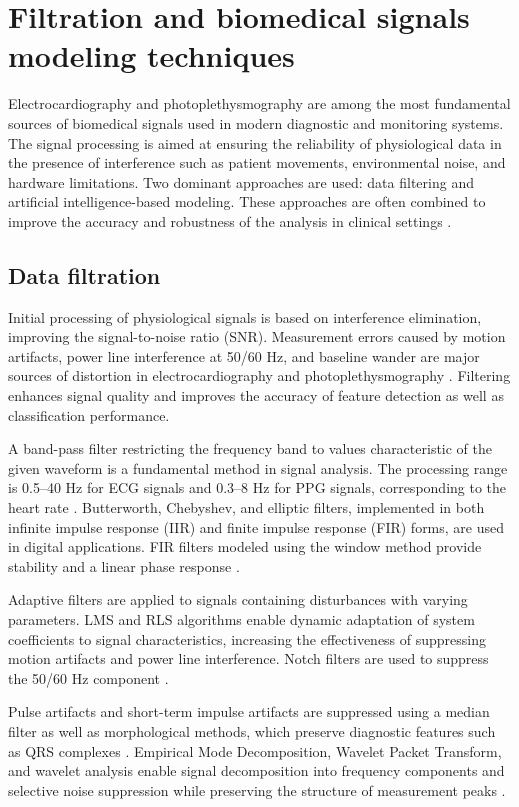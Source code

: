 \documentclass{citask}
\begin{document}
\section{Filtration and biomedical signals modeling techniques}
Electrocardiography and photoplethysmography are among the most fundamental sources of biomedical signals used in modern diagnostic and monitoring systems. The signal processing is aimed at ensuring the reliability of physiological data in the presence of interference such as patient movements, environmental noise, and hardware limitations. Two dominant approaches are used: data filtering and artificial intelligence-based modeling. These approaches are often combined to improve the accuracy and robustness of the analysis in clinical settings \cite{1}.

\subsection{Data filtration}
Initial processing of physiological signals is based on interference elimination, improving the signal-to-noise ratio (SNR). Measurement errors caused by motion artifacts, power line interference at 50/60 Hz, and baseline wander are major sources of distortion in electrocardiography and photoplethysmography \cite{2}. Filtering enhances signal quality and improves the accuracy of feature detection as well as classification performance.

A band-pass filter restricting the frequency band to values characteristic of the given waveform is a fundamental method in signal analysis. The processing range is 0.5–40 Hz for ECG signals and 0.3–8 Hz for PPG signals, corresponding to the heart rate \cite{3}. Butterworth, Chebyshev, and elliptic filters, implemented in both infinite impulse response (IIR) and finite impulse response (FIR) forms, are used in digital applications. FIR filters modeled using the window method provide stability and a linear phase response \cite{4}.

Adaptive filters are applied to signals containing disturbances with varying parameters. LMS and RLS algorithms enable dynamic adaptation of system coefficients to signal characteristics, increasing the effectiveness of suppressing motion artifacts and power line interference. Notch filters are used to suppress the 50/60 Hz component \cite{5}.

Pulse artifacts and short-term impulse artifacts are suppressed using a median filter as well as morphological methods, which preserve diagnostic features such as QRS complexes \cite{6}. Empirical Mode Decomposition, Wavelet Packet Transform, and wavelet analysis enable signal decomposition into frequency components and selective noise suppression while preserving the structure of measurement peaks \cite{7}.
\end{document}
